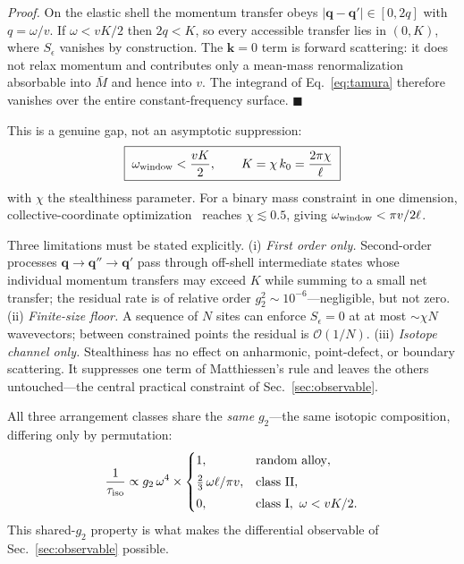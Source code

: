 \documentclass[
  aps,
  prl,
  reprint,
  amsmath,
  amssymb,
  superscriptaddress,
  floatfix,
  nofootinbib
]{revtex4-2}
\newcommand{\kzero}{k_{0}}
\begin{document}
\emph{Proof.} On the elastic shell the momentum transfer obeys
$|\bm q-\bm q'|\in[0,2q]$ with $q=\omega/v$. If $\omega<vK/2$ then $2q<K$, so
every accessible transfer lies in $(0,K)$, where $S_\epsilon$ vanishes by
construction. The $\bm k=0$ term is forward scattering: it does not relax
momentum and contributes only a mean-mass renormalization absorbable into
$\bar M$ and hence into $v$. The integrand of Eq.~\eqref{eq:tamura} therefore
vanishes over the entire constant-frequency surface. $\blacksquare$

This is a genuine gap, not an asymptotic suppression:
\begin{equation}
  \boxed{\;\omega_{\rm window}<\frac{vK}{2},
  \qquad K=\chi\,\kzero=\frac{2\pi\chi}{\ell}\;}
  \label{eq:window}
\end{equation}
with $\chi$ the stealthiness parameter. For a binary mass constraint in one
dimension, collective-coordinate optimization~\cite{Batten2008} reaches
$\chi\lesssim0.5$,
giving $\omega_{\rm window}<\pi v/2\ell$.

Three limitations must be stated explicitly. (i) \emph{First order only.}
Second-order processes $\bm q\to\bm q''\to\bm q'$ pass through off-shell
intermediate states whose individual momentum transfers may exceed $K$ while
summing to a small net transfer; the residual rate is of relative order
$g_2^{2}\sim10^{-6}$---negligible, but not zero. (ii) \emph{Finite-size floor.}
A sequence of $N$ sites can enforce $S_\epsilon=0$ at at most $\sim\chi N$
wavevectors; between constrained points the residual is $\mathcal{O}(1/N)$.
(iii) \emph{Isotope channel only.} Stealthiness has no effect on anharmonic,
point-defect, or boundary scattering. It suppresses one term of Matthiessen's
rule and leaves the others untouched---the central practical constraint of
Sec.~\ref{sec:observable}.

All three arrangement classes share the \emph{same} $g_2$---the same isotopic
composition, differing only by permutation:
\begin{equation}
  \frac{1}{\tau_{\rm iso}}\propto g_2\,\omega^{4}\times
  \begin{cases}
    1, & \text{random alloy},\\[3pt]
    \tfrac{2}{3}\,\omega\ell/\pi v, & \text{class II},\\[3pt]
    0, & \text{class I},\ \omega<vK/2 .
  \end{cases}
  \label{eq:summary}
\end{equation}
This shared-$g_2$ property is what makes the differential observable of
Sec.~\ref{sec:observable} possible.
\end{document}
